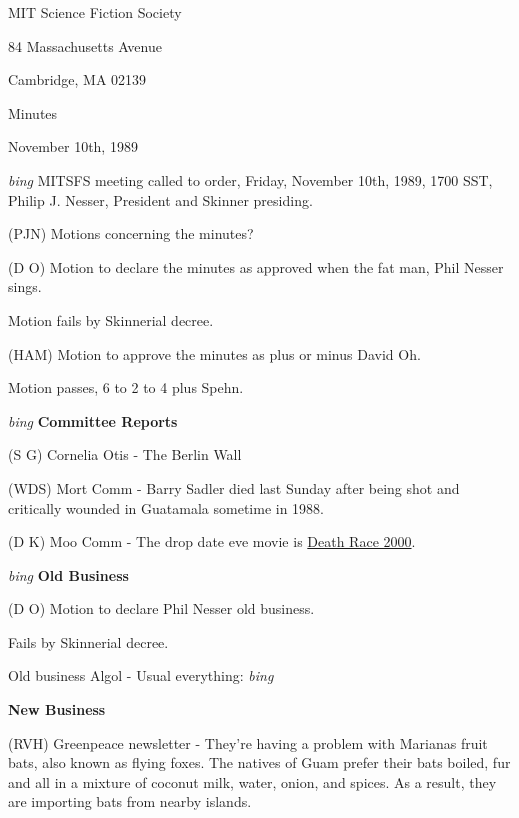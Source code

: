 \setlength{\topmargin}{-0.5in}
\setlength{\oddsidemargin}{-0.60in}
\setlength{\textheight}{9in}
\setlength{\textwidth}{6.5in}



\begin{center}
MIT Science Fiction Society

84 Massachusetts Avenue

Cambridge, MA 02139

\vspace{0.2in}
Minutes

November 10th, 1989

\end{center}
 
\vspace{0.15in}
{\em bing\/}  MITSFS meeting called to order, Friday, November 10th, 1989,
1700 SST, Philip J. Nesser, President and Skinner presiding.

(PJN) Motions concerning the minutes?

(D O) Motion to declare the minutes as approved when the fat man, Phil
Nesser sings.

Motion fails by Skinnerial decree.

(HAM) Motion to approve the minutes as plus or minus David Oh.

Motion passes, 6 to 2 to 4 plus Spehn.

\vspace{0.15in}
{\em bing\/} {\bf Committee Reports}

(S G) Cornelia Otis - The Berlin Wall

(WDS) Mort Comm - Barry Sadler died last Sunday after being shot and
critically wounded in Guatamala sometime in 1988. 

(D K) Moo Comm - The drop date eve movie is \underline{Death Race
2000}.

\vspace{0.15in}
{\em bing\/}  {\bf Old Business}

(D O) Motion to declare Phil Nesser old business.

Fails by Skinnerial decree.

Old business Algol - Usual everything: {\em bing\/}

\vspace{0.15in}
{\bf New Business}

(RVH) Greenpeace newsletter - They're having a problem with Marianas
fruit bats, also known as flying foxes.  The natives of Guam prefer
their bats boiled, fur and all in a mixture of coconut milk, water,
onion, and spices.  As a result, they are importing bats from nearby
islands.


